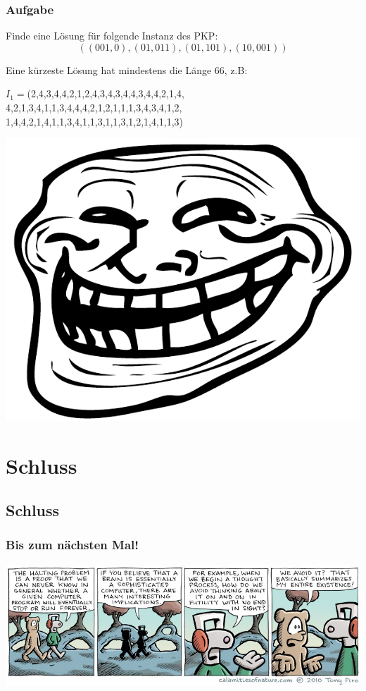 \begin{frame}
\frametitle{Aufgabe}
Finde eine Lösung für folgende Instanz des PKP:
$$ ((001,0),(01,011),(01,101),(10,001)) $$

\pause

Eine kürzeste Lösung hat mindestens die Länge 66, z.B:
\begin{center}
$ I_1 = $(2,4,3,4,4,2,1,2,4,3,4,3,4,4,3,4,4,2,1,4,\\
4,2,1,3,4,1,1,3,4,4,4,2,1,2,1,1,1,3,4,3,4,1,2,\\
1,4,4,2,1,4,1,1,3,4,1,1,3,1,1,3,1,2,1,4,1,1,3)
\end{center}

\pause

\includegraphics{images/trollface}

\end{frame}

\section{Schluss}
\subsection{Schluss}
\begin{frame}
	\frametitle{Bis zum nächsten Mal!}
    \begin{center}
        \includegraphics[width=\textwidth]{images/halting.jpg}
    \end{center}
\end{frame}


